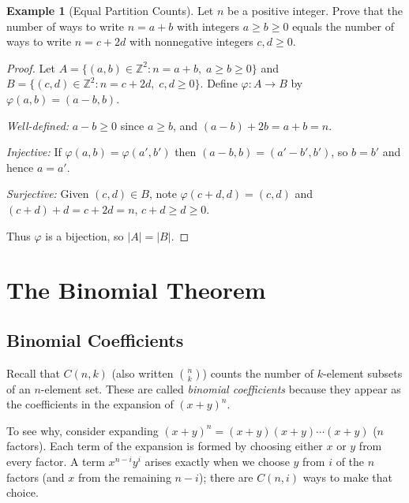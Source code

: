 \documentclass[11pt, a4paper, notitlepage]{report}
\theoremstyle{definition}
\newtheorem{example}[theorem]{Example}
\theoremstyle{remark}
\begin{document}
\begin{example}[Equal Partition Counts]
Let $n$ be a positive integer. Prove that the number of ways to write $n = a + b$ with integers
$a \geq b \geq 0$ equals the number of ways to write $n = c + 2d$ with nonnegative integers
$c, d \geq 0$.
\end{example}

\begin{proof}
Let $A = \{(a,b) \in \mathbb{Z}^2 : n = a+b,\; a \geq b \geq 0\}$ and
$B = \{(c,d) \in \mathbb{Z}^2 : n = c+2d,\; c, d \geq 0\}$.
Define $\varphi : A \to B$ by $\varphi(a, b) = (a-b, b)$.

\textit{Well-defined:} $a - b \geq 0$ since $a \geq b$, and $(a-b) + 2b = a+b = n$. \checkmark

\textit{Injective:} If $\varphi(a,b) = \varphi(a', b')$ then $(a-b, b) = (a'-b', b')$, so $b = b'$
and hence $a = a'$. \checkmark

\textit{Surjective:} Given $(c, d) \in B$, note $\varphi(c+d, d) = (c, d)$ and
$(c+d) + d = c + 2d = n$, $c+d \geq d \geq 0$. \checkmark

Thus $\varphi$ is a bijection, so $|A| = |B|$.
\end{proof}


\section{The Binomial Theorem}
\label{sec:binomial}

\subsection{Binomial Coefficients}

Recall that $C(n,k)$ (also written $\binom{n}{k}$) counts the number of $k$-element subsets of an
$n$-element set.  These are called \emph{binomial coefficients} because they appear as the
coefficients in the expansion of $(x+y)^n$.

To see why, consider expanding $(x+y)^n = (x+y)(x+y)\cdots(x+y)$ ($n$ factors).  Each term of the
expansion is formed by choosing either $x$ or $y$ from every factor.  A term $x^{n-i}y^{i}$ arises
exactly when we choose $y$ from $i$ of the $n$ factors (and $x$ from the remaining $n-i$); there are
$C(n,i)$ ways to make that choice.
\end{document}
